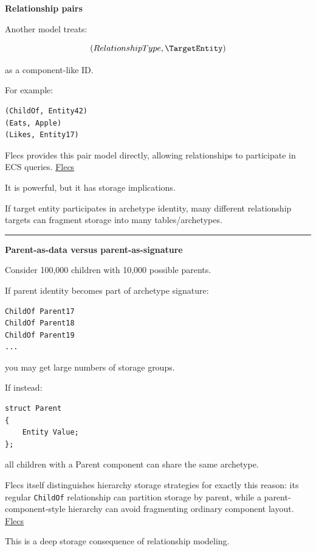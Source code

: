 \textbf{Relationship pairs}

Another model treats:

\[
(RelationshipType,\TargetEntity)
\]

as a component-like ID.

For example:

\begin{verbatim}
(ChildOf, Entity42)
(Eats, Apple)
(Likes, Entity17)
\end{verbatim}

Flecs provides this pair model directly, allowing relationships to participate in ECS queries. \href{https://www.flecs.dev/flecs/Relationships.html?utm_source=chatgpt.com}{Flecs}

It is powerful, but it has storage implications.

If target entity participates in archetype identity, many different relationship targets can fragment storage into many tables/archetypes.

\begin{center}\rule{0.5\linewidth}{0.5pt}\end{center}

\textbf{Parent-as-data versus parent-as-signature}

Consider 100,000 children with 10,000 possible parents.

If parent identity becomes part of archetype signature:

\begin{verbatim}
ChildOf Parent17
ChildOf Parent18
ChildOf Parent19
...
\end{verbatim}

you may get large numbers of storage groups.

If instead:

\begin{verbatim}
struct Parent
{
    Entity Value;
};
\end{verbatim}

all children with a Parent component can share the same archetype.

Flecs itself distinguishes hierarchy storage strategies for exactly this reason: its regular \texttt{ChildOf} relationship can partition storage by parent, while a parent-component-style hierarchy can avoid fragmenting ordinary component layout. \href{https://www.flecs.dev/flecs/HierarchiesManual.html?utm_source=chatgpt.com}{Flecs}

This is a deep storage consequence of relationship modeling.

